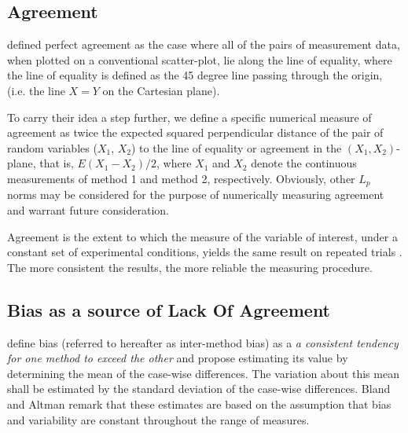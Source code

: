 \documentclass[12pt, a4paper]{report}
\theoremstyle{plain}
\theoremstyle{definition}
\theoremstyle{remark}
\begin{document}
	
	
	\subsection{Agreement}
	\citet{BA86} defined perfect agreement as the case where all of the pairs of measurement data, when plotted on a conventional scatter-plot, lie along the line of equality, where the line of equality is defined as the 45 degree line passing through the origin, (i.e. the line $X=Y$ on the Cartesian plane). 
	
	To carry their idea a step further, we define a specific numerical measure of agreement as twice the expected squared perpendicular distance of the pair of random variables ($X_1$, $X_2$) to the line of equality or agreement in the $(X_1,X_2)$-plane, that is, $E(X_1 - X_2)/2$, where $X_1$ and $X_2$ denote the continuous measurements of method 1 and method 2, respectively. Obviously, other $L_p$ norms may be considered for the purpose of numerically measuring agreement and warrant future consideration. 
	
	
	Agreement is the extent to which the measure of the variable of interest, under a constant set of experimental conditions, yields the same result on repeated trials \citep{sanchez1999}. The more consistent the results, the more reliable the measuring procedure.
	
	
	
	
	

	\subsection{Bias as a source of Lack Of Agreement}
\citet{BA83} define bias (referred to hereafter as inter-method bias) as a \emph{a consistent tendency for one method to exceed the other} and propose estimating its value by determining the mean of the case-wise differences. 
	The variation about this mean shall be estimated by the  standard deviation of the case-wise differences. Bland and Altman remark that these estimates are based on the assumption that bias and variability are constant throughout the
	range of measures.
	
	
	
\end{document}
